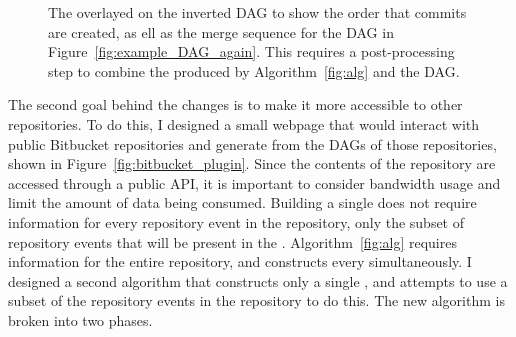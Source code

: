 \begin{figure}[htbp]
  \centering
  \caption{The \mt{} overlayed on the inverted DAG to show the order
    that commits are created, as ell as the merge sequence for the DAG
    in Figure~\ref{fig:example_DAG_again}. This requires a
    post-processing step to combine the \mt produced by
    Algorithm~\ref{fig:alg} and the DAG.}
\label{fig:repoDAGTree}
\vspace{-3mm}
\end{figure}

The second goal behind the changes is to make it more accessible to
other repositories. To do this, I designed a small webpage that would
interact with public Bitbucket repositories and generate  from the
DAGs of those repositories, shown in Figure~\ref{fig:bitbucket_plugin}.
Since the contents of the repository are accessed through a public API,
it is important to consider bandwidth usage and limit the amount of data
being consumed. Building a single \mt{} does not require information for
every repository event in the repository, only the subset of repository
events that will be present in the \mt{}. Algorithm~\ref{fig:alg}
requires information for the entire repository, and constructs every
\mt{} simultaneously. I designed a second algorithm that constructs only
a single \mt{}, and attempts to use a subset of the repository events in
the repository to do this. The new algorithm is broken into two phases.

